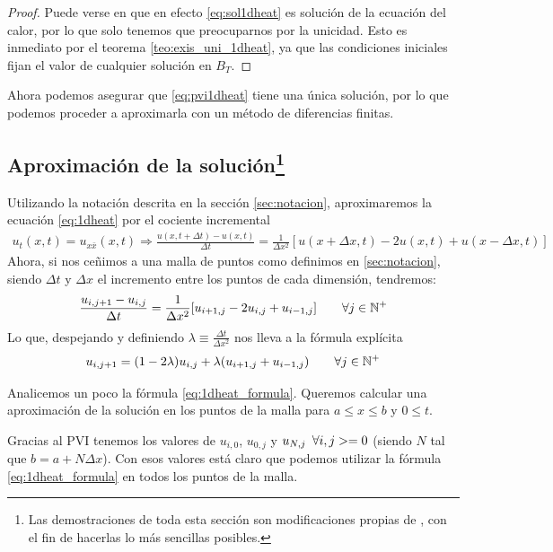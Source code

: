 \begin{proof}
	Puede verse en \cite{1dheat} que en efecto \ref{eq:sol1dheat} es solución de la ecuación del calor, por lo que solo tenemos que preocuparnos por la unicidad. Esto es inmediato por el teorema \ref{teo:exis_uni_1dheat}, ya que las condiciones iniciales fijan el valor de cualquier solución en $B_T$.
\end{proof}

Ahora podemos asegurar que \ref{eq:pvi1dheat} tiene una única solución, por lo que podemos proceder a aproximarla con un método de diferencias finitas.

\subsection[Aproximación de la solución]{Aproximación de la solución\footnote{Las demostraciones de toda esta sección son modificaciones propias de \cite{1dheat}, con el fin de hacerlas lo más sencillas posibles.}}
Utilizando la notación descrita en la sección \ref{sec:notacion}, aproximaremos la ecuación \ref{eq:1dheat} por el cociente incremental
\begin{multline} \label{eq:principio_aprox}
	u_t(x,t) = u_{x\bar{x}}(x,t) \Rightarrow \frac{u(x,t+\Delta t)-u(x,t)}{\Delta t} = \frac{1}{\Delta x^2}[u(x+\Delta x,t)-2u(x,t)+u(x-\Delta x, t)]
\end{multline}
Ahora, si nos ceñimos a una malla de puntos como definimos en \ref{sec:notacion}, siendo $\Delta t$ y $\Delta x$ el incremento entre los puntos de cada dimensión, tendremos:
\begin{equation}
	\frac{u_{i,j+1}-u_{i,j}}{\Delta t} = \frac{1}{\Delta x^2}[u_{i+1,j}-2u_{i,j}+u_{i-1,j}] \hspace{20px}\forall j\in \mathbb{N}^{+}
\end{equation}
Lo que, despejando y definiendo $\lambda \equiv \frac{\Delta t}{\Delta x^2}$ nos lleva a la fórmula explícita
\begin{equation}\label{eq:1dheat_formula}
	u_{i,j+1} = (1-2\lambda)u_{i,j}+\lambda(u_{i+1,j}+u_{i-1,j}) \hspace{20px} \forall j\in\mathbb{N}^+
\end{equation}

Analicemos un poco la fórmula \ref{eq:1dheat_formula}. Queremos calcular una aproximación de la solución en los puntos de la malla para $a\leq x\leq b$ y $0\leq t$.

Gracias al PVI tenemos los valores de $u_{i,0}$, $u_{0,j}$ y $u_{N,j} \hspace{5px}\forall i,j>=0$ (siendo $N$ tal que $b=a+N\Delta x$). Con esos valores está claro que podemos utilizar la fórmula \ref{eq:1dheat_formula} en todos los puntos de la malla.

